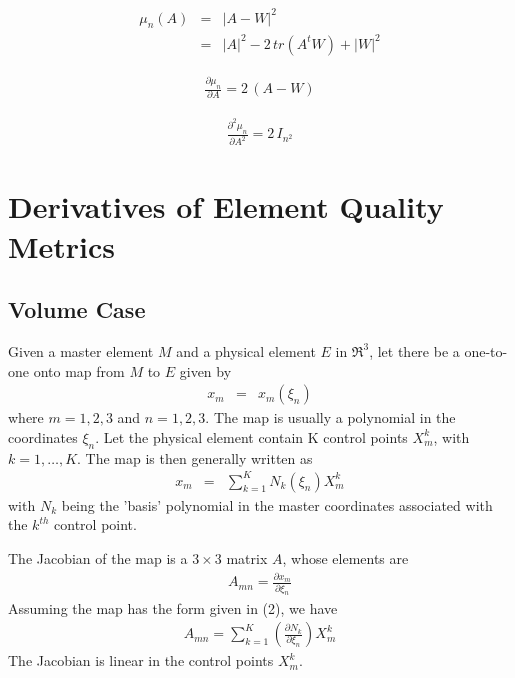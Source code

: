 \documentclass{report}
\begin{document}
\begin{eqnarray}
\mu_n (A) & = & |A-W|^2 \\
          & = & |A|^2 - 2 \, tr(A^t W) + |W|^2 \nonumber
\end{eqnarray}

\begin{eqnarray}
\frac{\partial \mu_n}{\partial A} = 2 \, (A-W)
\end{eqnarray}
 
\begin{eqnarray}
\frac{\partial^2 \mu_n}{\partial A^2} = 2 \, I_{n^2}
\end{eqnarray}

\chapter{Derivatives of Element Quality Metrics}

\section{Volume Case}

 \newline
Given a master element $M$ and a physical element 
$E$ in $\Re^3$, 
let there be a one-to-one onto map from $M$ to $E$ given by 
\begin{eqnarray}
x_m & = & x_m ( \xi_n )
\end{eqnarray}
where $m = 1, 2, 3$ and $n = 1, 2, 3$.  The map is usually a polynomial
in the coordinates $\xi_n$.  Let the physical element contain K control 
points $X_m^k$, with $k=1,\ldots,K$. The map is then generally written as 
\begin{eqnarray}
x_m & = & \sum_{k=1}^K N_k (\xi_n) X_m^k
\end{eqnarray}
with $N_k$ being the 'basis' polynomial in the master coordinates associated
with the $k^{th}$ control point. \newline

 \newline
The Jacobian of the map is a $3 \times 3$ matrix
$A$, whose elements are
\begin{eqnarray}
A_{mn} = \frac{\partial x_m}{\partial \xi_n} 
\end{eqnarray}
Assuming the map has the form given in (2), we have
\begin{eqnarray}
A_{mn} = \sum_{k=1}^K \left( \frac{\partial N_k}{\partial \xi_n} \right) X_m^k 
\end{eqnarray}
The Jacobian is linear in the control points $X_m^k$. \newline
\end{document}
